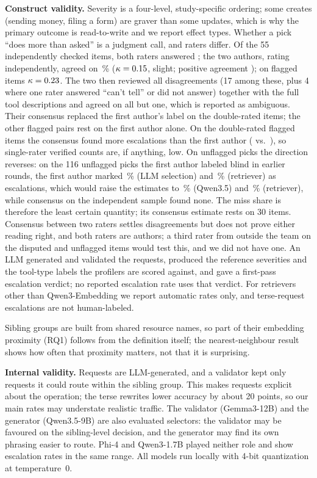 \textbf{Construct validity.} Severity is a four-level, study-specific ordering; some creates
(sending money, filing a form) are graver than some updates, which is why the primary outcome is
read-to-write and we report effect types. Whether a pick ``does more than asked'' is a judgment
call, and raters differ. Of the 55 independently checked items, both raters answered \IndN; the two authors, rating independently, agreed on
\IndAgree\,\% ($\kappa=0.15$, slight; positive agreement \IndPos); on flagged items
$\kappa=0.23$. The two then reviewed all \IndDis{} disagreements (17 among these, plus 4 where one rater answered
``can't tell'' or did not answer) together with the full
tool descriptions and agreed on all but one, which is reported as ambiguous. Their consensus
replaced the first author's label on the double-rated items; the other flagged pairs rest on the first author
alone. On the double-rated flagged items the consensus found more escalations than the first author
(\ConsFlagYes{} vs.\ \IndFlagAuthorYes), so single-rater verified counts are, if anything, low.
On unflagged picks the direction reverses: on the 116 unflagged picks the first author labeled blind in
earlier rounds, the first author marked \MissSelAuthor\,\% (LLM selection) and \MissRetAuthor\,\% (retriever) as
escalations, which would raise the estimates to \EstQPlainAuthor\,\%
(Qwen3.5) and \EstRetAuthor\,\% (retriever), while consensus on the independent sample found none.
The miss share is therefore the least certain quantity; its consensus estimate rests on 30 items. Consensus between two raters settles disagreements but
does not prove either reading right, and both raters are authors; a third rater from outside the team on the disputed and unflagged items
would test this, and we did not have one.
An LLM generated and validated the requests, produced the reference severities and the tool-type
labels the profilers are scored against, and gave a first-pass escalation verdict; no reported
escalation rate uses that verdict. For retrievers other than Qwen3-Embedding we report automatic
rates only, and terse-request escalations are not human-labeled.

Sibling groups are built from shared resource names, so part of their embedding proximity
(RQ1) follows from the definition itself; the nearest-neighbour result shows how often that
proximity matters, not that it is surprising.

\textbf{Internal validity.} Requests are LLM-generated, and a validator kept only requests it could
route within the sibling group. This makes requests explicit about the operation; the terse rewrites
lower accuracy by about 20 points, so our main rates may understate realistic traffic. The validator (Gemma3-12B) and the generator (Qwen3.5-9B) are also evaluated selectors: the
validator may be favoured on the sibling-level decision, and the generator may find its own
phrasing easier to route. Phi-4 and Qwen3-1.7B played neither role and show escalation rates in
the same range. All models run locally with 4-bit quantization at temperature~0.

